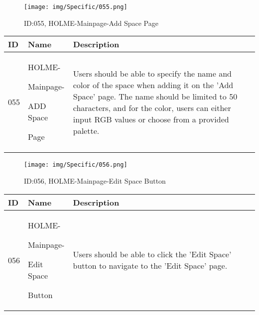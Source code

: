 \documentclass[conference]{IEEEtran}
\begin{document}
\begin{enumerate}
\begin{figure}[h]
\centering
\texttt{[image: img/Specific/055.png]}
\caption{ID:055, HOLME-Mainpage-Add Space Page}
\end{figure}
\begin{table}[h]
\def\arraystretch{1.2} \small
    \begin{tabular}{|p{1cm}|p{1.8cm}|p{5.0cm}|}
        \hline
        ID & Name & Description\\ \hline
         055 \par  & HOLME-\par Mainpage-\par ADD Space\par Page  &Users should be able to specify the name and color of the space when adding it on the 'Add Space' page. The name should be limited to 50 characters, and for the color, users can either input RGB values or choose from a provided palette.\\ \hline
    \end{tabular}
\end{table}

\begin{figure}[h]
\centering
\texttt{[image: img/Specific/056.png]}
\caption{ID:056, HOLME-Mainpage-Edit Space Button}
\end{figure}
\begin{table}[h]
\def\arraystretch{1.2} \small
    \begin{tabular}{|p{1cm}|p{1.8cm}|p{5.0cm}|}
        \hline
        ID & Name & Description\\ \hline
         056 \par  & HOLME-\par Mainpage-\par Edit Space\par Button &Users should be able to click the 'Edit Space' button to navigate to the 'Edit Space' page.\\ \hline
    \end{tabular}
\end{table}


\end{enumerate}
\end{document}
